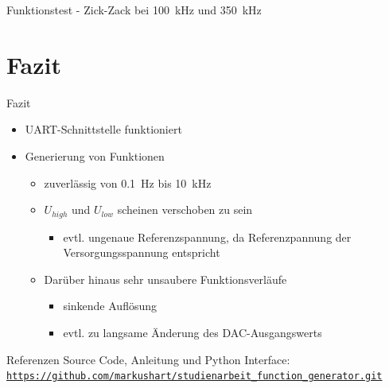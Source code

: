 \documentclass[11pt]{beamer}
\begin{document}
\begin{frame}{Funktionstest - Zick-Zack bei \SI{100}{\kilo\hertz} und \SI{350}{\kilo\hertz}}

  \begin{figure}

    \end{figure}
  
\end{frame}

\section{Fazit}
\begin{frame}{Fazit}
  \begin{itemize}
  \item UART-Schnittstelle funktioniert
  \item Generierung von Funktionen
    \begin{itemize}
      \item zuverlässig von \SI{0.1}{\hertz} bis \SI{10}{\kilo\hertz}
      \item $U_{high}$ und $U_{low}$ scheinen verschoben zu sein
      \begin{itemize}
        \item evtl. ungenaue Referenzspannung, da Referenzpannung der Versorgungsspannung entspricht
      \end{itemize}
      \item Darüber hinaus sehr unsaubere Funktionsverläufe
      \begin{itemize}
        \item sinkende Auflösung
        \item evtl. zu langsame Änderung des DAC-Ausgangswerts
      \end{itemize}
    \end{itemize}
  \end{itemize}
\end{frame}

\begin{frame}{Referenzen}
  Source Code, Anleitung und Python Interface:\\ 
  \href{https://github.com/markushart/studienarbeit_function_generator.git}{\small\texttt{https://github.com/markushart/studienarbeit\_function\_generator.git}}
\end{frame}
\end{document}
